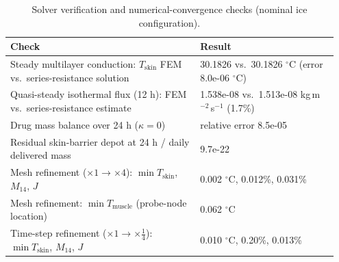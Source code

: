 \begin{table}[!htbp]
\centering
\caption{Solver verification and numerical-convergence checks (nominal ice configuration).}
\label{tab:identified_parameters}
\small
\setlength{\tabcolsep}{4pt}
\renewcommand{\arraystretch}{1.12}
\begin{tabular}{p{0.55\linewidth}p{0.40\linewidth}}
\toprule
Check & Result \\
\midrule
Steady multilayer conduction: $T_{\mathrm{skin}}$ FEM vs.\ series-resistance solution & 30.1826 vs.\ 30.1826 $^\circ$C (error 8.0e-06 $^\circ$C) \\
Quasi-steady isothermal flux (12 h): FEM vs.\ series-resistance estimate & 1.538e-08 vs.\ 1.513e-08 kg\,m$^{-2}$\,s$^{-1}$ (1.7\%) \\
Drug mass balance over 24 h ($\kappa=0$) & relative error 8.5e-05 \\
Residual skin-barrier depot at 24 h / daily delivered mass & 9.7e-22 \\
Mesh refinement ($\times1\to\times4$): $\min T_{\mathrm{skin}}$, $M_{14}$, $J$ & 0.002 $^\circ$C, 0.012\%, 0.031\% \\
Mesh refinement: $\min T_{\mathrm{muscle}}$ (probe-node location) & 0.062 $^\circ$C \\
Time-step refinement ($\times1\to\times\tfrac14$): $\min T_{\mathrm{skin}}$, $M_{14}$, $J$ & 0.010 $^\circ$C, 0.20\%, 0.013\% \\
\bottomrule
\end{tabular}
\end{table}
